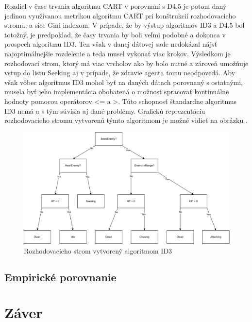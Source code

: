 \documentclass[slovak, master]{diploma}
\begin{document}
Rozdiel v čase trvania algoritmu CART v porovnaní s D4.5 je potom daný jedinou využívanou metrikou algoritmu CART pri konštrukcií rozhodovacieho stromu, a síce Gini indexom. V prípade, že by výstup algoritmov ID3 a D4.5 bol totožný, je predpoklad, že časy trvania by boli veľmi podobné a dokonca v prospech algoritmu ID3. Ten však v danej dátovej sade nedokázal nájsť najoptimálnejšie rozdelenie a teda musel vykonať viac krokov. Výsledkom je rozhodovací strom, ktorý má viac vrcholov ako by bolo nutné a zároveň umožňuje vstup do listu Seeking aj v prípade, že zdravie agenta tomu neodpovedá. Aby však vôbec algoritmus ID3 mohol byť na daných dátach porovnaný s ostatnými, musela byť jeho implementácia obohatená o možnosť spracovať kontinuálne hodnoty pomocou operátorov <= a >. Túto schopnosť štandardne algoritmus ID3 nemá a s tým súvisia aj dané problémy. Grafickú reprezentáciu rozhodovacieho stromu vytvorenú týmto algoritmom je možné vidieť na obrázku .

\begin{figure}[!htbp]
    \centering
    \includegraphics[width=1\textwidth]{Figures/idTree.png}
    \caption{Rozhodovacieho strom vytvorený algoritmom ID3}
    \label{pic:treeGraphID3}
\end{figure}


\section{Empirické porovnanie}
\label{sec:Gameplay}

\chapter{Záver}
\label{sec:Conclusion}
%

\printbibliography[title={Literatúra}, heading=bibintoc]
\end{document}
